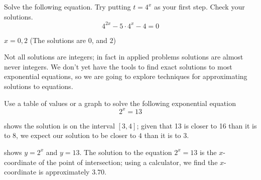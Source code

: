 \begin{doyouunderstand}
	\begin{problem}
	Solve the following equation.
	Try putting $t=4^x$ as your first step. Check your solutions.
	\[
		4^{2x}-5\cdot 4^x-4=0
	\]
	\begin{shortsolution}
		$x=0,2$ (The solutions are $0$, and $2$)
	\end{shortsolution}
	\end{problem}
\end{doyouunderstand}

Not all solutions are integers; in fact in applied problems solutions are almost never integers.
We don't yet have the tools to find exact solutions to most exponential equations, so we
are going to explore techniques for approximating solutions to equations.

\begin{pccexample}
	Use a table of values or a graph to solve the following exponential 
	equation
	\[
		2^x = 13
	\]
	\begin{pccsolution}
		shows the solution is on the interval $[3,4]$; given that 13 is closer to 16 than 
		it is to 8, we expect our solution to be closer to $4$ than it is to $3$.
														
		 shows $y=2^x$ and $y=13$. The solution 
		to the equation $2^x=13$ is the $x$-coordinate of the point of intersection; using a calculator, we find
		the $x$-coordinate is approximately $3.70$. 
	\end{pccsolution}
\end{pccexample}

